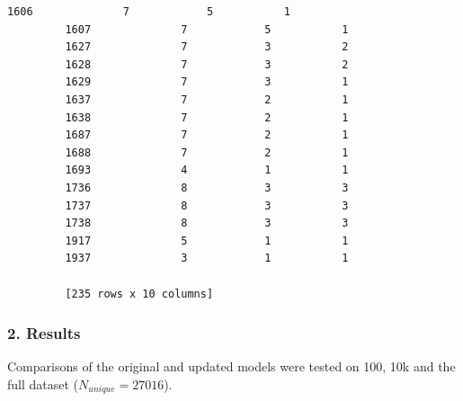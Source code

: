 \documentclass[11pt]{article}
\begin{document}
\begin{Verbatim}[commandchars=\\\{\}]
         1606              7            5           1  
         1607              7            5           1  
         1627              7            3           2  
         1628              7            3           2  
         1629              7            3           1  
         1637              7            2           1  
         1638              7            2           1  
         1687              7            2           1  
         1688              7            2           1  
         1693              4            1           1  
         1736              8            3           3  
         1737              8            3           3  
         1738              8            3           3  
         1917              5            1           1  
         1937              3            1           1  
         
         [235 rows x 10 columns]
\end{Verbatim}
            
    \subsubsection{2. Results}\label{results}

    Comparisons of the original and updated models were tested on 100, 10k
and the full dataset (\(N_{unique} =27016\)).
\end{document}

